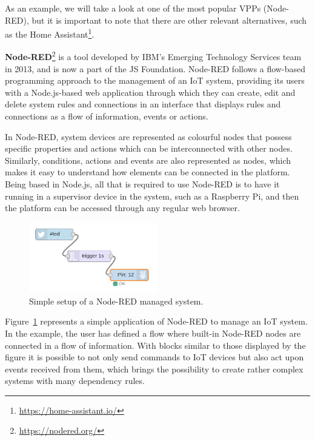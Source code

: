 \documentclass[runningheads]{llncs}
\begin{document}
As an example, we will take a look at one of the most popular VPPs (Node-RED), but it is important to note that there are other relevant alternatives, such as the Home Assistant\footnote{\url{https://home-assistant.io/}}.

\textbf{Node-RED}\footnote{\url{https://nodered.org/}} is a tool developed by IBM’s Emerging Technology Services team in 2013, and is now a part of the JS Foundation. Node-RED follows a flow-based programming approach to the management of an IoT system, providing its users with a Node.js-based web application through which they can create, edit and delete system rules and connections in an interface that displays rules and connections as a flow of information, events or actions.

In Node-RED, system devices are represented as colourful nodes that possess specific properties and actions which can be interconnected with other nodes. Similarly, conditions, actions and events are also represented as nodes, which makes it easy to understand how elements can be connected in the platform. Being based in Node.js, all that is required to use Node-RED is to have it running in a supervisor device in the system, such as a Raspberry Pi, and then the platform can be accessed through any regular web browser.

\begin{figure}
    \begin{center}
        \includegraphics[width=0.5\textwidth]{figures/nodered-simple.jpg}
        \caption{Simple setup of a Node-RED managed system.} \label{fig:nodered-simple}
    \end{center}
\end{figure}

Figure~\ref{fig:nodered-simple} represents a simple application of Node-RED to manage an IoT system. In the example, the user has defined a flow where built-in Node-RED nodes are connected in a flow of information. With blocks similar to those displayed by the figure it is possible to not only send commands to IoT devices but also act upon events received from them, which brings the possibility to create rather complex systems with many dependency rules.
\end{document}
